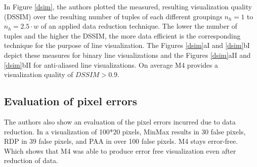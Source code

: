 In Figure \ref{dsim}, the authors plotted the measured, resulting visualization
quality (DSSIM) over the resulting number of tuples of each
different groupings $n_h = 1$ to $n_h = 2.5·w$ of an applied data
reduction technique. The lower the number of
tuples and the higher the DSSIM, the more data efficient is
the corresponding technique for the purpose of line visualization.
The Figures \ref{dsim}aI and \ref{dsim}bI depict these measures for
binary line visualizations and the Figures \ref{dsim}aII and \ref{dsim}bII
for anti-aliased line visualizations. On average
M4 provides a visualization quality of $DSSIM > 0.9$.

\subsection{Evaluation of pixel errors}
The authors also show an evaluation of the pixel errors incurred due to data reduction.
In a visualization of 100*20 pixels, MinMax results in 30 false pixels, RDP
in 39 false pixels, and PAA in over 100 false pixels. M4 stays
error-free. Which shows that M4 was able to produce error free visualization even after reduction of data.
